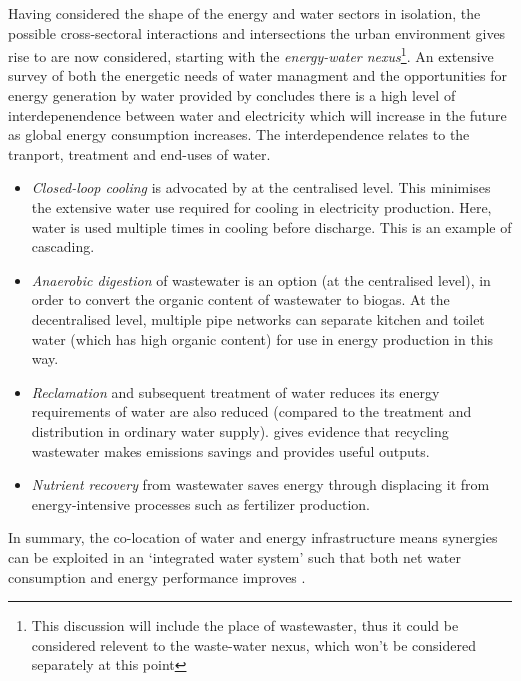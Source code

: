 Having considered the shape of the energy and water sectors in isolation, the possible cross-sectoral interactions and intersections the urban environment gives rise to are now considered, starting with the \emph{energy-water nexus}\footnote{This discussion will include the place of wastewaster, thus it could be considered relevent to the waste-water nexus, which won't be considered separately at this point}. An extensive survey of both the energetic needs of water managment and the opportunities for energy generation by water provided by \citep{McMahon2011} concludes there is a high level of interdepenendence between water and electricity which will increase in the future as global energy consumption increases. The interdependence relates to the tranport, treatment and end-uses of water.
\begin{itemize}
	\item \emph{Closed-loop cooling} is advocated by \citet{McMahon2011} at the centralised level. This minimises the extensive water use required for cooling in electricity production. Here, water is used multiple times in cooling before discharge. This is an example of cascading.
	\item \emph{Anaerobic digestion} of wastewater is an option (at the centralised level), in order to convert the organic content of wastewater to biogas. At the decentralised level, multiple pipe networks can separate kitchen and toilet water (which has high organic content) for use in energy production in this way.
	\item \emph{Reclamation} and subsequent treatment of water reduces its energy requirements of water are also reduced (compared to the treatment and distribution in ordinary water supply). \citet{Lundin2000} gives evidence that recycling wastewater makes emissions savings and provides useful outputs.
	\item \emph{Nutrient recovery} from wastewater saves energy through displacing it from  energy-intensive processes such as fertilizer production. 
\end{itemize}
In summary, the co-location of water and energy infrastructure means synergies can be exploited in an `integrated water system' such that both net water consumption and energy performance improves \citep{Makropoulos2008}.

